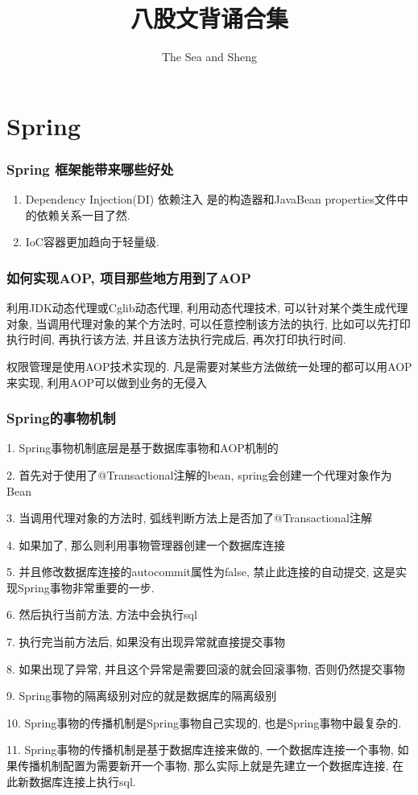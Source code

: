 \documentclass[UTF8]{ctexart}
\begin{document}
	
	\title{八股文背诵合集}
	\author{The Sea and Sheng}
	\maketitle
	
	\tableofcontents
	\newpage
	
	\section{Spring}
	\subsubsection{Spring 框架能带来哪些好处}

	\begin{enumerate}
		\item Dependency Injection(DI) 依赖注入 是的构造器和JavaBean properties文件中的依赖关系一目了然.
		\item IoC容器更加趋向于轻量级.
	\end{enumerate}
\subsubsection{如何实现AOP, 项目那些地方用到了AOP}
利用JDK动态代理或Cglib动态代理, 利用动态代理技术, 可以针对某个类生成代理对象, 当调用代理对象的某个方法时, 可以任意控制该方法的执行, 比如可以先打印执行时间, 再执行该方法, 并且该方法执行完成后, 再次打印执行时间. \par
权限管理是使用AOP技术实现的. 凡是需要对某些方法做统一处理的都可以用AOP来实现, 利用AOP可以做到业务的无侵入 \par
\subsubsection{Spring的事物机制}
1. Spring事物机制底层是基于数据库事物和AOP机制的 \par
2. 首先对于使用了@Transactional注解的bean, spring会创建一个代理对象作为Bean \par
3. 当调用代理对象的方法时, 弧线判断方法上是否加了@Transactional注解 \par
4. 如果加了, 那么则利用事物管理器创建一个数据库连接 \par
5. 并且修改数据库连接的autocommit属性为false, 禁止此连接的自动提交, 这是实现Spring事物非常重要的一步. \par
6. 然后执行当前方法, 方法中会执行sql \par
7. 执行完当前方法后, 如果没有出现异常就直接提交事物 \par
8. 如果出现了异常, 并且这个异常是需要回滚的就会回滚事物, 否则仍然提交事物 \par
9. Spring事物的隔离级别对应的就是数据库的隔离级别 \par
10. Spring事物的传播机制是Spring事物自己实现的, 也是Spring事物中最复杂的. \par
11. Spring事物的传播机制是基于数据库连接来做的, 一个数据库连接一个事物, 如果传播机制配置为需要新开一个事物, 那么实际上就是先建立一个数据库连接, 在此新数据库连接上执行sql.
\end{document}

